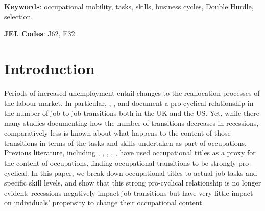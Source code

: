 \documentclass[11pt, oneside]{article}
\begin{document}
	\textbf{Keywords}: occupational mobility, tasks, skills, business cycles, Double Hurdle, selection. 
	
	\vspace{2mm}
	
	\textbf{JEL Codes}: J62, E32
	
	\newpage
	\doublespacing
	\section{Introduction}
	\label{sec:Introduction}
	
	Periods of increased unemployment entail changes to the reallocation processes of the labour market. In particular,  \cite{Carrillo-Tudela2016},  \cite{MurphyTopel1987}, \cite{Moscarini2007} and \cite{Kambourov2008} document a pro-cyclical relationship in the number of job-to-job transitions both in the UK and the US. Yet, while there many studies documenting how the number of transitions decreases in recessions, comparatively less is known about what happens to the content of those transitions in terms of the tasks and skills undertaken as part of occupations. Previous literature, including \cite{MurphyTopel1987}, \cite{Moscarini2007}, \cite{Kambourov2008}, \cite{Carrillo-Tudela2014}, \cite{Carrillo-Tudela2016}, have used occupational titles as a proxy for the content of occupations, finding occupational transitions to be strongly pro-cyclical. 	
	In this paper, we break down occupational titles to actual job tasks and specific skill levels, and show that this strong pro-cyclical relationship is no longer evident: recessions negatively impact job transitions but have very little impact on individuals' propensity to change their occupational content. 
	
		\vspace{2mm}
	
\end{document}
